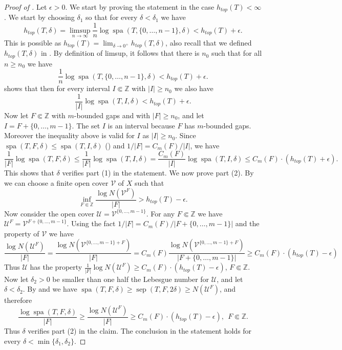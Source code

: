 \documentclass[a4paper,oneside]{amsart}
\renewcommand{\(}{\begin{dmath*}}
\renewcommand{\)}{\end{dmath*}}
\theoremstyle{definition}
\newcommand{\Z}{\mathbb{Z}}
\newcommand{\U}{\mathcal{U}}
\newcommand{\sep}{\operatorname{sep}}
\newcommand{\spa}{\operatorname{spa}}
\begin{document}
\begin{proof}[Proof of ]
    Let $\epsilon>0$. We start by proving the statement in the case $h_{top}(T)<\infty$. We start by choosing $\delta_1$ so that for every $\delta<\delta_1$ we have
\[h_{top}(T,\delta)=\limsup_{n\to\infty} \frac{1}{n} \log \spa(T,\{0,\dots,n-1\},\delta)<h_{top}(T)+\epsilon.
\]
This is possible as $h_{top}(T)=\lim_{\delta\to 0^+}h_{top}(T,\delta)$, also recall that we defined $h_{top}(T,\delta) $  in . By definition of limsup, it follows that there is $n_0$ such that for all $n\geq n_0$ we have 
\[ 
 \frac{1}{n}\log \spa(T,\{0,\dots,n-1\},\delta)<h_{top}(T)+\epsilon.\]
 shows that then for every interval $I\Subset \Z$ with $|I|\geq n_0$ we also have 
\begin{dmath}\frac{1}{|I|}\log \spa(T,I,\delta)<h_{top}(T)+\epsilon.\end{dmath}
Now let $F\Subset \Z$ with $m$-bounded gaps and with $|F|\geq n_0$, and let $I=F+\{0,\dots,m-1\}$. The set $I$ is an interval because $F$ has $m$-bounded gaps. Moreover the  inequality above is valid for $I$ as $|I|\geq n_0$. Since  $\spa(T,F,\delta)\leq\spa(T,I,\delta)$ () and $1/|F|=C_m(F)/|I|$, we have
\(
\frac{1}{|F|}\log \spa(T,F,\delta)\leq  \frac{1}{|F|}\log \spa(T,I,\delta) =  \frac{C_m(F)}{|I|}\log \spa(T,I,\delta)\leq C_m(F)\cdot(h_{top}(T)+\epsilon).
\)
This shows that $\delta$ verifies part (1) in 
the statement. 
We now prove part (2). By  we can choose a finite open cover $\mathcal V$ of $X$ such that
\[\inf_{F\Subset \Z}\frac{\log N(\mathcal V ^F)}{|F|}> h_{top}(T)-\epsilon.\]
Now consider the open cover $\U=\mathcal V^{\{0,\dots,m-1\}}$. For any $F\Subset \Z$ we have $\U^F=\mathcal V^{F+\{0,\dots,m-1\}}$. Using the fact $1/|F|=C_m(F)/|F+\{0,\dots,m-1\}|$ and the property of $\mathcal V$ we have
\begin{dmath}\frac{\log N(\U^F)}{|F|}=\frac{\log N(\mathcal V^{\{0,\dots,m-1\}+F})}{|F|}=C_m(F)\frac{\log N(\mathcal V^{\{0,\dots,m-1\}+F})}{|F+\{0,\dots,m-1\}|} \geq C_m(F)\cdot(h_{top}(T)-\epsilon)\end{dmath}
Thus $\U$ has the property $\frac{1}{|F|}\log N(\U^F)\geq C_m(F)\cdot (h_{top}(T)-\epsilon)$, $F\Subset \Z$. Now let $\delta_2>0$ be smaller than one half the Lebesgue number for $\U$, and let $\delta<\delta_2$. By  and  we have  $\spa(T,F,\delta)\geq \sep(T,F,2\delta)\geq N(\U^F)$, and therefore 
\(\label{cool-inequality-2}
\frac{\log \spa(T,F,\delta)}{|F|}\geq  \frac{\log N(\U^F)}{|F|}\geq  C_m(F)\cdot (h_{top}(T)-\epsilon), \ \ F\Subset\Z.
\)
Thus $\delta$ verifies part (2) in the claim. The conclusion in the statement holds for every $\delta<\min\{\delta_1,\delta_2\}$. 
%


\end{proof}
\end{document}
